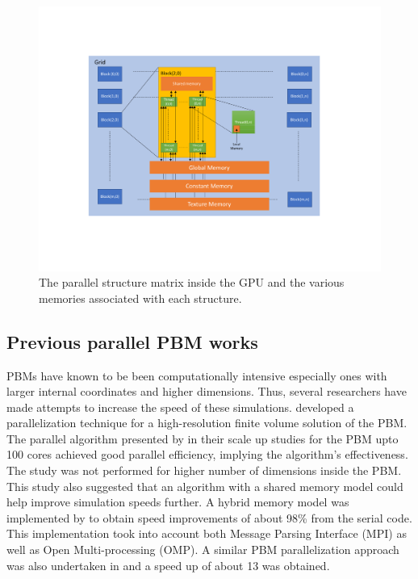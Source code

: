 \documentclass[preprint,10pt,authoryear]{elsarticle}
\begin{document}
\begin{linenumbers}
\begin{figure}
\centering
\includegraphics[scale=0.6]{bkg_gpu_arch.pdf}
\caption{The parallel structure matrix inside the GPU and the various memories associated 
with each structure.}
\label{fig:bkg_gpu_arch}
\end{figure}


\subsection{Previous parallel PBM works}
PBMs have known to be been computationally intensive especially ones with larger internal 
coordinates and higher dimensions. Thus, several researchers have made attempts to increase 
the speed of these simulations. \cite{Gunawan2008} developed a parallelization technique 
for a high-resolution finite volume solution of the PBM. The parallel algorithm presented by 
\cite{Gunawan2008} in their scale up studies for the PBM upto 100 cores achieved good 
parallel efficiency, implying the algorithm's effectiveness. The study was not performed for 
higher number of dimensions inside the PBM. This study also suggested that an algorithm 
with a shared memory model could help improve simulation speeds further. A hybrid memory model 
was implemented by \cite{Bettencourt2017} to obtain speed improvements of about 98\% from the 
serial code. This implementation took into account both Message Parsing Interface (MPI) as well 
as Open Multi-processing (OMP). A similar PBM parallelization approach was also undertaken in 
\citep{Sampat2018} and a speed up of about 13 was obtained. 


\end{linenumbers}
\end{document}
